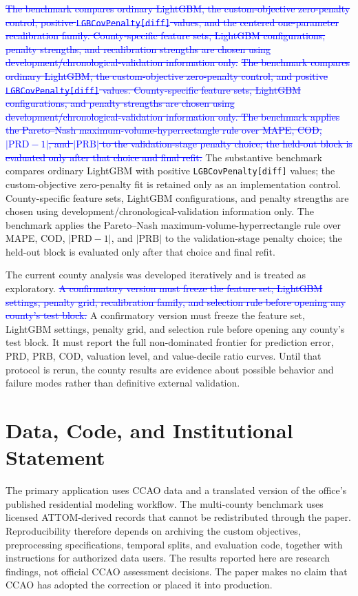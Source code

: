 \documentclass[10pt]{article}
\theoremstyle{definition}
\newcommand{\1}{\mathbf{1}}
\newcommand{\advisorchange}[1]{{\color{blue}#1}}
\newcommand{\oldtext}[1]{\textcolor{blue}{\sout{#1}}}
\newcommand{\newtext}[1]{\textcolor{impGreen}{#1}}
\begin{document}
\oldtext{The benchmark compares ordinary LightGBM, the custom-objective zero-penalty control, positive \texttt{LGBCovPenalty[diff]} values, and the centered one-parameter recalibration family. County-specific feature sets, LightGBM configurations, penalty strengths, and recalibration strengths are chosen using development/chronological-validation information only.}
\oldtext{The benchmark compares ordinary LightGBM, the custom-objective zero-penalty control, and positive \texttt{LGBCovPenalty[diff]} values. County-specific feature sets, LightGBM configurations, and penalty strengths are chosen using development/chronological-validation information only. The benchmark applies the Pareto--Nash maximum-volume-hyperrectangle rule over MAPE, COD, $|\mathrm{PRD}-1|$, and $|\mathrm{PRB}|$ to the validation-stage penalty choice; the held-out block is evaluated only after that choice and final refit.}
\newtext{The substantive benchmark compares ordinary LightGBM with positive \texttt{LGBCovPenalty[diff]} values; the custom-objective zero-penalty fit is retained only as an implementation control. County-specific feature sets, LightGBM configurations, and penalty strengths are chosen using development/chronological-validation information only. The benchmark applies the Pareto--Nash maximum-volume-hyperrectangle rule over MAPE, COD, $|\mathrm{PRD}-1|$, and $|\mathrm{PRB}|$ to the validation-stage penalty choice; the held-out block is evaluated only after that choice and final refit.}

The current county analysis was developed iteratively and is treated as exploratory. \oldtext{A confirmatory version must freeze the feature set, LightGBM settings, penalty grid, recalibration family, and selection rule before opening any county's test block.} \newtext{A confirmatory version must freeze the feature set, LightGBM settings, penalty grid, and selection rule before opening any county's test block.} It must report the full non-dominated frontier for prediction error, PRD, PRB, COD, 
\newtext{valuation level}, and value-decile ratio curves. Until that protocol is rerun, the county results are evidence about possible behavior and failure modes rather than definitive external validation.

\section*{Data, Code, and Institutional Statement}

\advisorchange{The primary application uses CCAO data} and a translated version of the office's published residential modeling workflow. The multi-county benchmark uses licensed ATTOM-derived records that cannot be redistributed through the paper. Reproducibility therefore depends on archiving the custom objectives, preprocessing specifications, temporal splits, and evaluation code, together with instructions for authorized data users. The results reported here are research findings, not official CCAO assessment decisions. The paper makes no claim that CCAO has adopted the correction or placed it into production.
\end{document}
